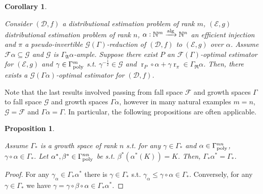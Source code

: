 \documentclass{article}
\numberwithin{equation}{section}
\theoremstyle{definition}
\theoremstyle{plain}
\newtheorem{proposition}{Proposition}[section]
\newtheorem{corollary}{Corollary}[section]
\DeclareMathOperator{\R}{r}
\newcommand{\Nats}{\mathbb{N}}
\newcommand{\Dist}{\mathcal{D}}
\newcommand{\GrowR}{\Gamma_{\mathfrak{R}}}
\newcommand{\GrowA}{\Gamma_{\mathfrak{A}}}
\newcommand{\Fall}{\mathcal{F}}
\newcommand{\EG}{\Fall(\Gamma)}
\newcommand{\GammaPoly}{\Gamma_{\textnormal{poly}}}
\newcommand{\Alg}{\xrightarrow{\textnormal{alg}}}
\begin{document}
\begin{samepage}
\begin{corollary}
\label{crl:p_reduce}

Consider $(\Dist,f)$ a distributional estimation problem of rank ${m}$, $(\mathcal{E},g)$ distributional estimation problem of rank ${n}$, ${\alpha: \Nats^m \Alg \Nats^n}$ an efficient injection and $\pi$ a pseudo-invertible $\mathcal{G}(\Gamma)$-reduction of $(\Dist, f)$ to $(\mathcal{E}, g)$ over ${\alpha}$. Assume ${\Fall\alpha \subseteq \mathcal{G}}$ and ${\mathcal{G}}$ is ${\GrowA \alpha}$-ample. Suppose there exist ${P}$ an $\EG$-optimal estimator for $(\mathcal{E}, g)$ and ${\gamma \in \GammaPoly^m}$ s.t. ${\gamma^{-\frac{1}{2}} \in \mathcal{G}}$ and ${\R_P \circ \alpha + \gamma\R_\pi \in \GrowR \alpha}$. Then, there exists a $\mathcal{G} (\Gamma \alpha)$-optimal estimator for $(\Dist, f)$.


\end{corollary}
\end{samepage}

Note that the last results involved passing from fall space ${\Fall}$ and growth spaces ${\Gamma}$ to fall space ${\mathcal{G}}$ and growth spaces ${\Gamma \alpha}$, however in many natural examples ${m = n}$, ${\mathcal{G} = \Fall}$ and ${\Gamma \alpha = \Gamma}$. In particular, the following propositions are often applicable.

\begin{samepage}
\begin{proposition}
\label{prp:stable_growth_space}

Assume ${\Gamma_*}$ is a growth space of rank ${n}$ s.t. for any ${\gamma \in \Gamma_*}$ and ${\alpha \in \GammaPoly^{nn}}$, ${\gamma \circ \alpha \in \Gamma_*}$. Let ${\alpha^*, \beta^* \in \GammaPoly^{nn}}$ be s.t. ${\beta^*(\alpha^*(K))=K}$. Then, ${\Gamma_* \alpha^* = \Gamma_*}$.

\end{proposition}
\end{samepage}

\begin{proof}

For any ${\gamma_\alpha \in \Gamma_* \alpha^*}$ there is ${\gamma \in \Gamma_*}$ s.t. ${\gamma_\alpha \leq \gamma \circ \alpha \in \Gamma_*}$. Conversely, for any ${\gamma \in \Gamma_*}$ we have ${\gamma = \gamma \circ \beta \circ \alpha \in \Gamma_* \alpha^*}$.
%
\end{proof}
\end{document}

